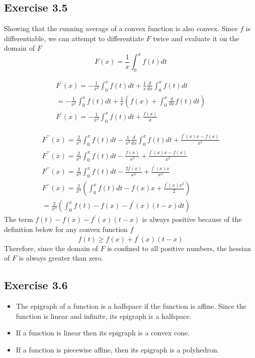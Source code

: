 \subsection{Exercise 3.5}
Showing that the running average of a convex function is also convex. Since $f$ is differentiable, we can attempt to differentiate $F$ twice and evaluate it on the domain of $F$
\begin{equation}
  F(x) = \frac{1}{x} \int_{0}^{x} f(t)dt
\end{equation}

\begin{gather}
  F^\prime(x) = -\frac{1}{x^2} \int_{0}^{x} f(t)dt + \frac{1}{x} \frac{d }{d x}  \int_{0}^{x} f(t)dt \\
= -\frac{1}{x^2} \int_{0}^{x} f(t)dt + \frac{1}{x} (f(x)+ \int_{0}^{x}\frac{d }{d x} f(t)dt) \\
F^\prime(x) = -\frac{1}{x^2} \int_{0}^{x} f(t)dt + \frac{f(x)}{x}
\end{gather}

\begin{gather}
  F^{\prime \prime}(x) = \frac{2}{x^3} \int_{0}^{x} f(t)dt - \frac{1}{x^2} \frac{d }{d x}  \int_{0}^{x} f(t)dt + \frac{f^\prime(x)x - f(x)}{x^2} \\ 
  F^{\prime \prime}(x) = \frac{2}{x^3} \int_{0}^{x} f(t)dt - \frac{f(x)}{x^2} + \frac{f^\prime(x)x - f(x)}{x^2} \\
  F^{\prime \prime}(x) = \frac{2}{x^3} \int_{0}^{x} f(t)dt - \frac{2f(x)}{x^2} + \frac{f^\prime(x)x}{x^2} \\ 
  F^{\prime \prime}(x) = \frac{2}{x^3}( \int_{0}^{x} f(t)dt - f(x)x + \frac{f^\prime(x)x^2}{2}) \\
  = \frac{2}{x^3}( \int_{0}^{x} f(t) - f(x)  - f^\prime(x)(t-x)dt)
\end{gather}
The term $f(t) - f(x) - f^\prime(x)(t-x)$ is always positive because of the definition below for any convex function $f$
\begin{equation}
  f(t) \geq f(x) + f^\prime(x)(t-x)
\end{equation}
Therefore, since the domain of $F$ is confined to all positive numbers, the hessian of $F$ is always greater than zero.
\subsection{Exercise 3.6}
\begin{itemize}
  \item The epigraph of a function is a halfspace if the function is affine. Since the function is linear and infinite, its epigraph is a halfspace. 
  \item If a function is linear then its epigraph is a convex cone.
  \item If a function is piecewise affine, then its epigraph is a polyhedron.
\end{itemize} 

